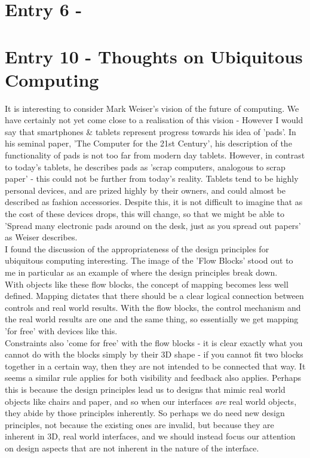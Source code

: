 \documentclass{article}
\begin{document}
\section*{Entry 6 - }

\section*{Entry 10 - Thoughts on Ubiquitous Computing}

\noindent It is interesting to consider Mark Weiser's vision of the future of computing. We have certainly not yet come close to a realisation of this vision - However I would say that smartphones \& tablets represent progress towards his idea of 'pads'. In his seminal paper, 'The Computer for the 21st Century', his description of the functionality of pads is not too far from modern day tablets. However, in contrast to today's tablets, he describes pads as 'scrap computers, analogous to scrap paper' - this could not be further from today's reality. Tablets tend to be highly personal devices, and are prized highly by their owners, and could almost be described as fashion accessories. Despite this, it is not difficult to imagine that as the cost of these devices drops, this will change, so that we might be able to 'Spread many electronic pads around on the desk, just as you spread out papers' as Weiser describes.
\\\indent I found the discussion of the appropriateness of the design principles for ubiquitous computing interesting. The image of the 'Flow Blocks' stood out to me in particular as an example of where the design principles break down.
\\\indent With objects like these flow blocks, the concept of mapping becomes less well defined. Mapping dictates that there should be a clear logical connection between controls and real world results. With the flow blocks, the control mechanism and the real world results are one and the same thing, so essentially we get mapping 'for free' with devices like this.
\\\indent Constraints also 'come for free' with the flow blocks - it is clear exactly what you cannot do with the blocks simply by their 3D shape - if you cannot fit two blocks together in a certain way, then they are not intended to be connected that way. It seems a similar rule applies for both visibility and feedback also applies. Perhaps this is because the design principles lead us to designs that mimic real world objects like chairs and paper, and so when our interfaces \emph{are} real world objects, they abide by those principles inherently. So perhaps we do need new design principles, not because the existing ones are invalid, but because they are inherent in 3D, real world interfaces, and we should instead focus our attention on design aspects that are not inherent in the nature of the interface.
\end{document}
